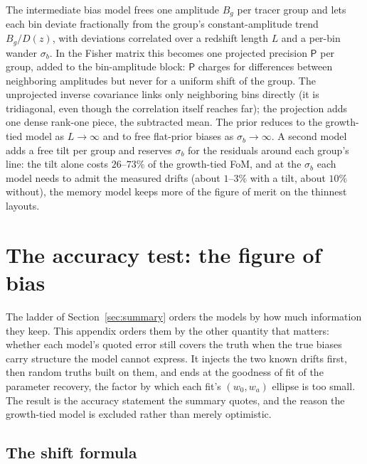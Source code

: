 \documentclass[11pt]{article}
\newcommand{\Prec}{\mathsf{P}}
\begin{document}
The intermediate bias model frees one amplitude $B_g$ per tracer group
and lets each bin deviate fractionally from the group's
constant-amplitude trend $B_g / D(z)$, with deviations correlated over a
redshift length $L$ and a per-bin wander $\sigma_b$.  In the Fisher
matrix this becomes one projected precision $\Prec$ per group, added to
the bin-amplitude block: $\Prec$ charges for differences between
neighboring amplitudes but never for a uniform shift of the group.  The
unprojected inverse covariance links only neighboring bins directly
(it is tridiagonal, even though the correlation itself reaches far);
the projection adds one dense rank-one piece, the subtracted mean.
The prior reduces to the growth-tied model as
$L \to \infty$ and to free flat-prior biases as
$\sigma_b \to \infty$.  A second model adds a free tilt per group
and reserves $\sigma_b$ for the residuals around each group's line:
the tilt alone costs $26$--$73\%$ of the growth-tied FoM, and at the
$\sigma_b$ each model needs to admit the measured drifts (about
$1$--$3\%$ with a tilt, about $10\%$ without), the memory model
keeps more of the figure of merit on the thinnest layouts.

\section{The accuracy test: the figure of bias}
\label{app:bias}

The ladder of Section~\ref{sec:summary} orders the models by how much
information they keep.  This appendix orders them by the other
quantity that matters: whether each model's quoted error still covers
the truth when the true biases carry structure the model cannot
express.  It injects the two known drifts first, then random truths
built on them, and ends at the goodness of fit of the parameter
recovery, the factor by which each fit's $(w_0, w_a)$ ellipse is too
small.  The result is the
accuracy statement the summary quotes, and the reason the growth-tied
model
is excluded rather than merely optimistic.

\subsection{The shift formula}
\label{sec:biasformula}
\end{document}
